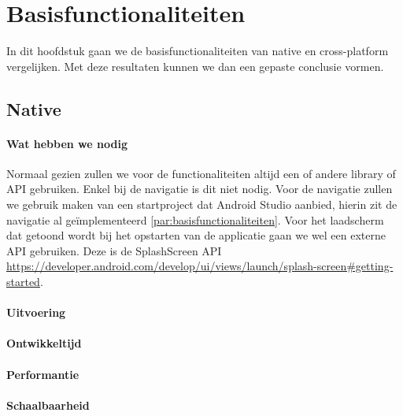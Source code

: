 
\chapter{Basisfunctionaliteiten}%
\label{ch:basisfunctionaliteiten}

In dit hoofdstuk gaan we de basisfunctionaliteiten van native en cross-platform vergelijken. 
Met deze resultaten kunnen we dan een gepaste conclusie vormen.

\section{Native}
\subsubsection{Wat hebben we nodig}
Normaal gezien zullen we voor de functionaliteiten altijd een of andere library of API gebruiken. Enkel bij de navigatie is dit niet nodig. 
Voor de navigatie zullen we gebruik maken van een startproject dat Android Studio aanbied, hierin zit de navigatie al geïmplementeerd 
\ref{par:basisfunctionaliteiten}. Voor het laadscherm dat getoond wordt bij het opstarten van de applicatie gaan we wel een externe API gebruiken. 
Deze is de SplashScreen API \url{https://developer.android.com/develop/ui/views/launch/splash-screen#getting-started}.

\subsubsection{Uitvoering}



\subsubsection{Ontwikkeltijd}



\subsubsection{Performantie}



\subsubsection{Schaalbaarheid}

